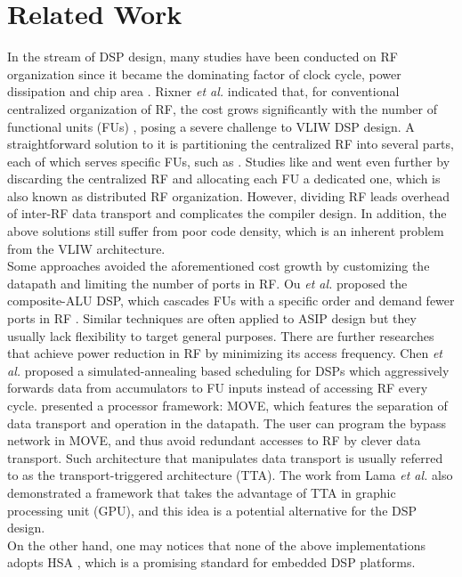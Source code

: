 \chapter{Related Work}
\label{cha:related}
    In the stream of DSP design, many studies have been conducted on RF organization since it became the dominating factor of clock cycle, power dissipation and chip area \cite{register}.
    Rixner \textit{et al.} indicated that, for conventional centralized organization of RF, the cost grows significantly with the number of functional units (FUs) \cite{register}, posing a severe challenge to VLIW DSP design.
    A straightforward solution to it is partitioning the centralized RF into several parts, each of which serves specific FUs, such as \cite{cluster}.
    Studies like \cite{synzen} and \cite{dsplite} went even further by discarding the centralized RF and allocating each FU a dedicated one, which is also known as distributed RF organization.
    However, dividing RF leads overhead of inter-RF data transport and complicates the compiler design.
    In addition, the above solutions still suffer from poor code density, which is an inherent problem from the VLIW architecture.
    \\\indent
    Some approaches avoided the aforementioned cost growth by customizing the datapath and limiting the number of ports in RF.
    Ou \textit{et al.} proposed the composite-ALU DSP, which cascades FUs with a specific order and demand fewer ports in RF \cite{cascade} \cite{hearaid}.
    Similar techniques are often applied to ASIP design but they usually lack flexibility to target general purposes.
    There are further researches that achieve power reduction in RF by minimizing its access frequency.
    Chen \textit{et al.} proposed a simulated-annealing based scheduling for DSPs which aggressively forwards data from accumulators to FU inputs instead of accessing RF every cycle\cite{multistage}.
    \cite{move} presented a processor framework: MOVE, which features the separation of data transport and operation in the datapath. 
    The user can program the bypass network in MOVE, and thus avoid redundant accesses to RF by clever data transport.
    Such architecture that manipulates data transport is usually referred to as the transport-triggered architecture (TTA).
    The work from Lama \textit{et al.} \cite{ttagpu} also demonstrated a framework that takes the advantage of TTA in graphic processing unit (GPU), and this idea is a potential alternative for the DSP design.
    \\\indent
    On the other hand, one may notices that none of the above implementations adopts HSA \cite{systemspec}, which is a promising standard for embedded DSP platforms.
